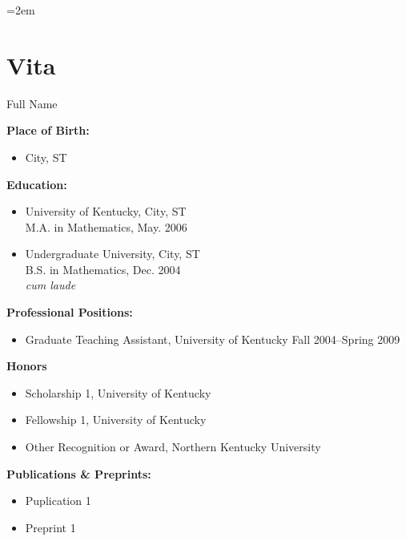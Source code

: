 \documentclass[final]{ukthesis} %
\begin{document}
\emergencystretch=2em %





\newpage
\chapter{Vita}
\begin{center}
\large{Full Name}
\end{center}

\textbf{Place of Birth:}
\begin{itemize}
\item City, ST
\end{itemize}

\textbf{Education:}
\begin{itemize}
\item University of Kentucky, City, ST\\M.A. in Mathematics, May. 2006
\item Undergraduate University, City, ST\\B.S. in Mathematics, Dec. 2004\\ \textit{cum laude}
\end{itemize}

\textbf{Professional Positions:}
\begin{itemize}
\item Graduate Teaching Assistant, University of Kentucky Fall 2004--Spring 2009
\end{itemize}

\textbf{Honors}
\begin{itemize}
\item Scholarship 1, University of Kentucky
\item Fellowship 1, University of Kentucky
\item Other Recognition or Award, Northern Kentucky University
\end{itemize}

\textbf{Publications \& Preprints:}
\begin{itemize}
\item Puplication 1
\item Preprint 1
\end{itemize}
\end{document}
